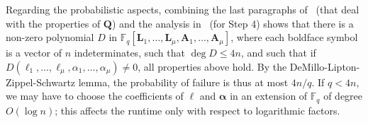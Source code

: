 \documentclass[sigconf]{acmart}
\newcommand{\F}{\mathbb{F}}
\begin{document}
Regarding the probabilistic aspects, combining the last paragraphs
of~\cite[Sec.~2.1]{KaVi04} (that deal with the properties of ${\bm
  Q}$) and the analysis
in~\cite{Kaltofen:1991:PEP:113379.113396,Kaltofen-saun:1991:WMS:646027.676885}
(for Step 4) shows that there is a non-zero polynomial $D$ in
$\F_q[{\bm L}_1,\dots,{\bm L}_\mu,{\bm A}_1,\dots,{\bm A}_\mu]$, where
each boldface symbol is a vector of $n$ indeterminates, such that
$\deg D \le 4n$, and such that if
$D({\ell}_1,\dots,{\ell}_\mu,{\alpha}_1,\dots,{\alpha}_\mu)\ne 0$, all
properties above hold. By the DeMillo-Lipton-Zippel-Schwartz lemma,
the probability of failure is thus at most $4n/q$. If $q < 4n$, we may
have to choose the coefficients of ${\bm \ell}$ and ${\bm \alpha}$ in
an extension of $\F_q$ of degree $O(\log n)$; this affects the runtime
only with respect to logarithmic factors.
\end{document}
